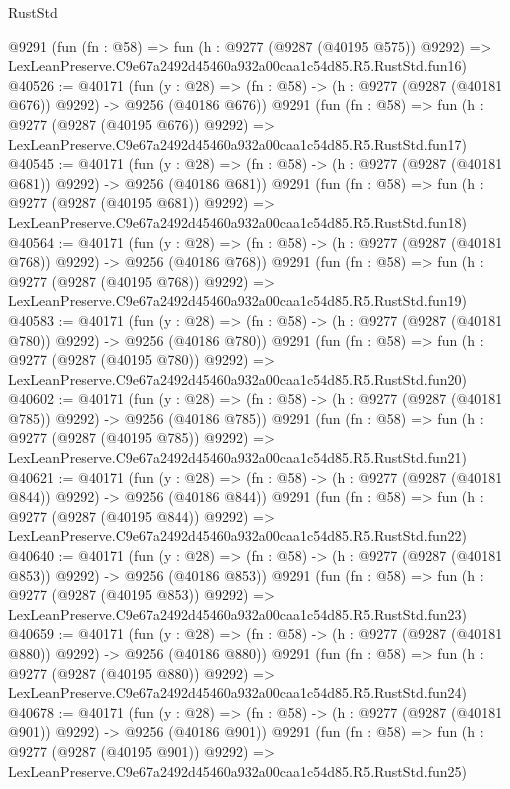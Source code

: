 \begin{lexlean}{RustStd}
\begin{coremodule}
    @9291
    (fun (fn : @58) =>
    fun (h : @9277 (@9287 (@40195 @575)) @9292) =>
    LexLeanPreserve.C9e67a2492d45460a932a00caa1c54d85.R5.RustStd.fun16)
@40526 := @40171
    (fun (y : @28) => (fn : @58) -> (h : @9277 (@9287 (@40181 @676)) @9292) -> @9256 (@40186 @676))
    @9291
    (fun (fn : @58) =>
    fun (h : @9277 (@9287 (@40195 @676)) @9292) =>
    LexLeanPreserve.C9e67a2492d45460a932a00caa1c54d85.R5.RustStd.fun17)
@40545 := @40171
    (fun (y : @28) => (fn : @58) -> (h : @9277 (@9287 (@40181 @681)) @9292) -> @9256 (@40186 @681))
    @9291
    (fun (fn : @58) =>
    fun (h : @9277 (@9287 (@40195 @681)) @9292) =>
    LexLeanPreserve.C9e67a2492d45460a932a00caa1c54d85.R5.RustStd.fun18)
@40564 := @40171
    (fun (y : @28) => (fn : @58) -> (h : @9277 (@9287 (@40181 @768)) @9292) -> @9256 (@40186 @768))
    @9291
    (fun (fn : @58) =>
    fun (h : @9277 (@9287 (@40195 @768)) @9292) =>
    LexLeanPreserve.C9e67a2492d45460a932a00caa1c54d85.R5.RustStd.fun19)
@40583 := @40171
    (fun (y : @28) => (fn : @58) -> (h : @9277 (@9287 (@40181 @780)) @9292) -> @9256 (@40186 @780))
    @9291
    (fun (fn : @58) =>
    fun (h : @9277 (@9287 (@40195 @780)) @9292) =>
    LexLeanPreserve.C9e67a2492d45460a932a00caa1c54d85.R5.RustStd.fun20)
@40602 := @40171
    (fun (y : @28) => (fn : @58) -> (h : @9277 (@9287 (@40181 @785)) @9292) -> @9256 (@40186 @785))
    @9291
    (fun (fn : @58) =>
    fun (h : @9277 (@9287 (@40195 @785)) @9292) =>
    LexLeanPreserve.C9e67a2492d45460a932a00caa1c54d85.R5.RustStd.fun21)
@40621 := @40171
    (fun (y : @28) => (fn : @58) -> (h : @9277 (@9287 (@40181 @844)) @9292) -> @9256 (@40186 @844))
    @9291
    (fun (fn : @58) =>
    fun (h : @9277 (@9287 (@40195 @844)) @9292) =>
    LexLeanPreserve.C9e67a2492d45460a932a00caa1c54d85.R5.RustStd.fun22)
@40640 := @40171
    (fun (y : @28) => (fn : @58) -> (h : @9277 (@9287 (@40181 @853)) @9292) -> @9256 (@40186 @853))
    @9291
    (fun (fn : @58) =>
    fun (h : @9277 (@9287 (@40195 @853)) @9292) =>
    LexLeanPreserve.C9e67a2492d45460a932a00caa1c54d85.R5.RustStd.fun23)
@40659 := @40171
    (fun (y : @28) => (fn : @58) -> (h : @9277 (@9287 (@40181 @880)) @9292) -> @9256 (@40186 @880))
    @9291
    (fun (fn : @58) =>
    fun (h : @9277 (@9287 (@40195 @880)) @9292) =>
    LexLeanPreserve.C9e67a2492d45460a932a00caa1c54d85.R5.RustStd.fun24)
@40678 := @40171
    (fun (y : @28) => (fn : @58) -> (h : @9277 (@9287 (@40181 @901)) @9292) -> @9256 (@40186 @901))
    @9291
    (fun (fn : @58) =>
    fun (h : @9277 (@9287 (@40195 @901)) @9292) =>
    LexLeanPreserve.C9e67a2492d45460a932a00caa1c54d85.R5.RustStd.fun25)

\end{coremodule}
\end{lexlean}
